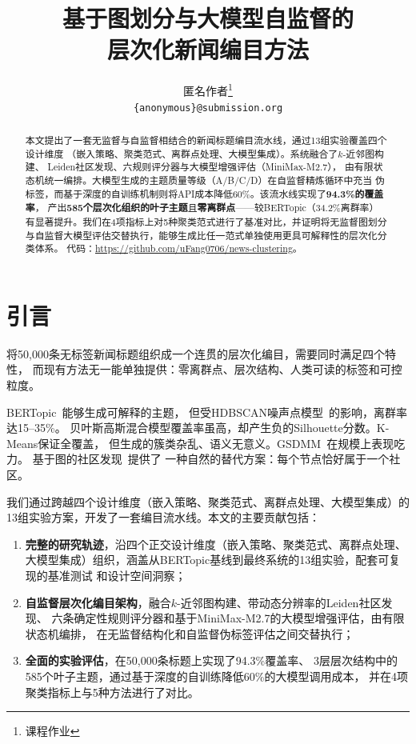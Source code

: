 \documentclass[10pt,twocolumn,twoside]{ctexart}
\title{\textbf{基于图划分与大模型自监督的\\层次化新闻编目方法}}
\author{匿名作者\thanks{课程作业}\\\texttt{\{anonymous\}@submission.org}}
\date{}
\begin{document}
\maketitle

\begin{abstract}
本文提出了一套无监督与自监督相结合的新闻标题编目流水线，通过13组实验覆盖四个设计维度
（嵌入策略、聚类范式、离群点处理、大模型集成）。系统融合了$k$-近邻图构建、
Leiden社区发现、六规则评分器与大模型增强评估（MiniMax-M2.7），
由有限状态机统一编排。大模型生成的主题质量等级（A/B/C/D）在自监督精炼循环中充当
伪标签，而基于深度的自训练机制则将API成本降低60\%。该流水线实现了\textbf{94.3\%的覆盖率}，
产出\textbf{585个层次化组织的叶子主题}且\textbf{零离群点}——较BERTopic（34.2\%离群率）
有显著提升。我们在4项指标上对5种聚类范式进行了基准对比，并证明将无监督图划分
与自监督大模型评估交替执行，能够生成比任一范式单独使用更具可解释性的层次化分类体系。
代码：\url{https://github.com/uFang0706/news-clustering}。
\end{abstract}

\section{引言}

将50,000条无标签新闻标题组织成一个连贯的层次化编目，需要同时满足四个特性，
而现有方法无一能单独提供：零离群点、层次结构、人类可读的标签和可控粒度。

BERTopic~\cite{grootendorst2022bertopic}能够生成可解释的主题，
但受HDBSCAN噪声点模型~\cite{mcinnes2017hdbscan}的影响，离群率达15--35\%。
贝叶斯高斯混合模型覆盖率虽高，却产生负的Silhouette分数。K-Means保证全覆盖，
但生成的簇类杂乱、语义无意义。GSDMM~\cite{yin2014gsdmm}在规模上表现吃力。
基于图的社区发现~\cite{newman2006modularity,traag2019leiden}提供了
一种自然的替代方案：每个节点恰好属于一个社区。

我们通过跨越四个设计维度（嵌入策略、聚类范式、离群点处理、大模型集成）的
13组实验方案，开发了一套编目流水线。本文的主要贡献包括：

\begin{enumerate}
    \item \textbf{完整的研究轨迹}，沿四个正交设计维度（嵌入策略、聚类范式、离群点处理、
    大模型集成）组织，涵盖从BERTopic基线到最终系统的13组实验，配套可复现的基准测试
    和设计空间洞察；
    \item \textbf{自监督层次化编目架构}，融合$k$-近邻图构建、带动态分辨率的Leiden社区发现、
    六条确定性规则评分器和基于MiniMax-M2.7的大模型增强评估，由有限状态机编排，
    在无监督结构化和自监督伪标签评估之间交替执行；
    \item \textbf{全面的实验评估}，在50,000条标题上实现了94.3\%覆盖率、
    3层层次结构中的585个叶子主题，通过基于深度的自训练降低60\%的大模型调用成本，
    并在4项聚类指标上与5种方法进行了对比。
\end{enumerate}
\end{document}
